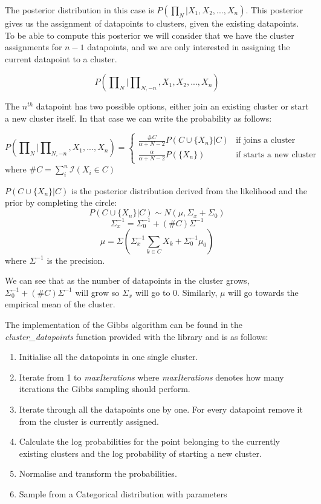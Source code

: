 \documentclass[12pt,a4paper]{article}
\begin{document}
The posterior distribution in this case is $P(\prod\nolimits_{N}|X_{1}, X_{2}, ..., X_{n})$. This posterior gives us the assignment of datapoints to clusters, given the existing datapoints. To be able to compute this posterior we will consider that we have the cluster assignments for $n-1$ datapoints, and we are only interested in assigning the current datapoint to a cluster. 

$$P(\prod\nolimits_{N}|\prod\nolimits_{N, -n}, X_{1}, X_{2}, ..., X_{n})$$

The $n^{th}$ datapoint has two possible options, either join an existing cluster or start a new cluster itself. In that case we can write the probability as follows: 

$$P(\prod\nolimits_{N}|\prod\nolimits_{N, -n}, X_{1}, ..., X_{n}) = \left \{
    \begin{array}{ll}
		\frac{\#C}{\alpha+ N - 2}P(C \cup \{X_{n}\}|C) & \mbox{if joins a cluster} \\
		\frac{\alpha}{\alpha+N-2}P(\{X_{n}\}) & \mbox{if starts a new cluster} 
	\end{array}
\right.$$
where $\#C = \sum_{i}^{n}\mathcal{I}(X_{i} \in C)$

$P(C \cup \{X_{n}\}|C)$ is the posterior distribution derived from the likelihood and the prior by completing the circle:
$$P(C \cup \{X_{n}\}|C) \sim N(\mu, \Sigma_{x} + \Sigma_{0})$$
$$\Sigma_{x}^{-1} = \Sigma_{0}^{-1} + (\#C)\Sigma^{-1}$$
$$\mu = \Sigma(\Sigma_{x}^{-1}\sum_{k \in C}X_{k} + \Sigma_{0}^{-1}\mu_{0})$$
where $\Sigma^{-1}$ is the precision.

We can see that as the number of datapoints in the cluster grows, $\Sigma_{0}^{-1} + (\#C)\Sigma^{-1}$ will grow so $\Sigma_{x}$ will go to 0. Similarly, $\mu$ will go towards the empirical mean of the cluster.

The implementation of the Gibbs algorithm can be found in the \textit{cluster\_datapoints} function provided with the library and is as follows:

\begin{enumerate}
    \item Initialise all the datapoints in one single cluster.
    \item Iterate from 1 to \textit{maxIterations} where \textit{maxIterations} denotes how many iterations the Gibbs sampling should perform. 
    \item Iterate through all the datapoints one by one. For every datapoint remove it from the cluster is currently assigned.
    \item Calculate the log probabilities for the point belonging to the currently existing clusters and the log probability of starting a new cluster.
    \item Normalise and transform the probabilities.
    \item Sample from a Categorical distribution with parameters
\end{enumerate}
\end{document}
